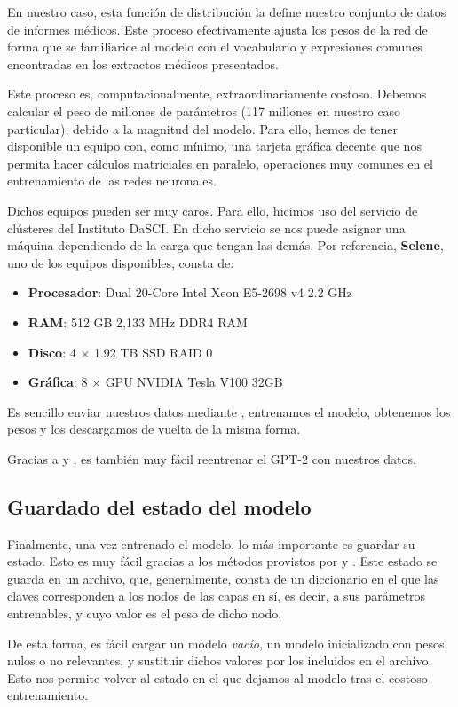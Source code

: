 En nuestro caso, esta función de distribución la define nuestro conjunto de datos de informes médicos. Este proceso efectivamente ajusta los pesos de la red de forma que se familiarice al modelo con el vocabulario y expresiones comunes encontradas en los extractos médicos presentados.

Este proceso es, computacionalmente, extraordinariamente costoso. Debemos calcular el peso de millones de parámetros (117 millones en nuestro caso particular), debido a la magnitud del modelo. Para ello, hemos de tener disponible un equipo con, como mínimo, una tarjeta gráfica decente que nos permita hacer cálculos matriciales en paralelo, operaciones muy comunes en el entrenamiento de las redes neuronales.

Dichos equipos pueden ser muy caros. Para ello, hicimos uso del servicio de clústeres del Instituto DaSCI. En dicho servicio se nos puede asignar una máquina dependiendo de la carga que tengan las demás. Por referencia, \textbf{Selene}, uno de los equipos disponibles, consta de:
\begin{itemize}
	\item \textbf{Procesador}: Dual 20-Core Intel Xeon E5-2698 v4 2.2 GHz
	\item \textbf{RAM}: 512 GB 2,133 MHz DDR4 RAM
	\item \textbf{Disco}: 4 $\times$ 1.92 TB SSD RAID 0
	\item \textbf{Gráfica}: 8 $\times$ GPU NVIDIA Tesla V100 32GB 
\end{itemize}

Es sencillo enviar nuestros datos mediante , entrenamos el modelo, obtenemos los pesos y los descargamos de vuelta de la misma forma.

Gracias a  y , es también muy fácil reentrenar el GPT-2 con nuestros datos.

\subsection{Guardado del estado del modelo}
Finalmente, una vez entrenado el modelo, lo más importante es guardar su estado. Esto es muy fácil gracias a los métodos provistos por  y . Este estado se guarda en un archivo, que, generalmente, consta de un diccionario en el que las claves corresponden a los nodos de las capas en sí, es decir, a sus parámetros entrenables, y cuyo valor es el peso de dicho nodo. 

De esta forma, es fácil cargar un modelo \textit{vacío}, un modelo inicializado con pesos nulos o no relevantes, y sustituir dichos valores por los incluidos en el archivo. Esto nos permite volver al estado en el que dejamos al modelo tras el costoso entrenamiento.

